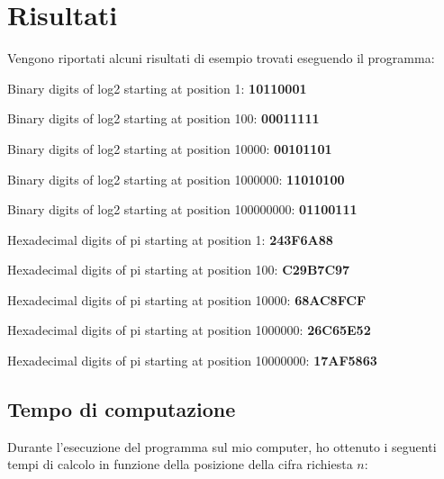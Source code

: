 \section{Risultati}
Vengono riportati alcuni risultati di esempio trovati eseguendo il programma:
\newline

Binary digits of log2 starting at position 1: \textbf{10110001}

Binary digits of log2 starting at position 100: \textbf{00011111}

Binary digits of log2 starting at position 10000: \textbf{00101101}

Binary digits of log2 starting at position 1000000: \textbf{11010100}

Binary digits of log2 starting at position 100000000: \textbf{01100111}
\newline

Hexadecimal digits of pi starting at position 1: \textbf{243F6A88}

Hexadecimal digits of pi starting at position 100: \textbf{C29B7C97}

Hexadecimal digits of pi starting at position 10000: \textbf{68AC8FCF}

Hexadecimal digits of pi starting at position 1000000: \textbf{26C65E52}

Hexadecimal digits of pi starting at position 10000000: \textbf{17AF5863}

\subsection{Tempo di computazione}
Durante l'esecuzione del programma sul mio computer, ho ottenuto i seguenti tempi di calcolo in funzione della posizione della cifra richiesta $n$:



